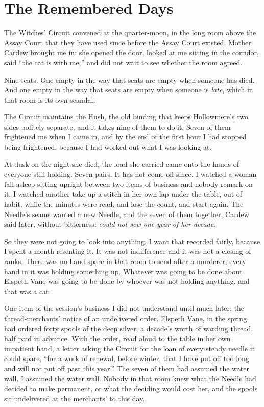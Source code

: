 \chapter{The Remembered Days}

The Witches' Circuit convened at the quarter-moon, in the long room above the Assay Court that they have used since before the Assay Court existed. Mother Cardew brought me in: she opened the door, looked at me sitting in the corridor, said ``the cat is with me,'' and did not wait to see whether the room agreed.

Nine seats. One empty in the way that seats are empty when someone has died. And one empty in the way that seats are empty when someone is \emph{late}, which in that room is its own scandal.

The Circuit maintains the Hush, the old binding that keeps Hollowmere's two sides politely separate, and it takes nine of them to do it. Seven of them frightened me when I came in, and by the end of the first hour I had stopped being frightened, because I had worked out what I was looking at.

At dusk on the night she died, the load she carried came onto the hands of everyone still holding. Seven pairs. It has not come off since. I watched a woman fall asleep sitting upright between two items of business and nobody remark on it. I watched another take up a stitch in her own lap under the table, out of habit, while the minutes were read, and lose the count, and start again. The Needle's seams wanted a new Needle, and the seven of them together, Cardew said later, without bitterness: \emph{could not sew one year of her decade}.

So they were not going to look into anything. I want that recorded fairly, because I spent a month resenting it. It was not indifference and it was not a closing of ranks. There was no hand spare in that room to send after a murderer; every hand in it was holding something up. Whatever was going to be done about Elspeth Vane was going to be done by whoever was not holding anything, and that was a cat.

One item of the session's business I did not understand until much later: the thread-merchants' notice of an undelivered order. Elspeth Vane, in the spring, had ordered forty spools of the deep silver, a decade's worth of warding thread, half paid in advance. With the order, read aloud to the table in her own impatient hand, a letter asking the Circuit for the loan of every steady needle it could spare, ``for a work of renewal, before winter, that I have put off too long and will not put off past this year.'' The seven of them had assumed the water wall. I assumed the water wall. Nobody in that room knew what the Needle had decided to make permanent, or what the deciding would cost her, and the spools sit undelivered at the merchants' to this day.

